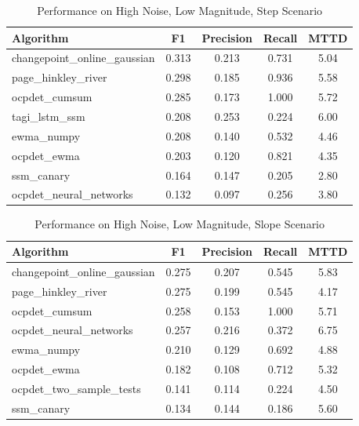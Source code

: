 \documentclass[journal,article,submit,pdftex,moreauthors]{Definitions/mdpi}
\begin{document}
\clearpage

\begin{table}[ht]
\centering
\caption{Performance on High Noise, Low Magnitude, Step Scenario}
\label{tab:scenario_alto_bajo_escalon}
\small
\begin{tabular}{lcccc}
\toprule
\textbf{Algorithm} & \textbf{F1} & \textbf{Precision} & \textbf{Recall} & \textbf{MTTD} \\
\midrule
changepoint\_online\_gaussian & 0.313 & 0.213 & 0.731 & 5.04 \\
page\_hinkley\_river & 0.298 & 0.185 & 0.936 & 5.58 \\
ocpdet\_cumsum & 0.285 & 0.173 & 1.000 & 5.72 \\
tagi\_lstm\_ssm & 0.208 & 0.253 & 0.224 & 6.00 \\
ewma\_numpy & 0.208 & 0.140 & 0.532 & 4.46 \\
ocpdet\_ewma & 0.203 & 0.120 & 0.821 & 4.35 \\
ssm\_canary & 0.164 & 0.147 & 0.205 & 2.80 \\
ocpdet\_neural\_networks & 0.132 & 0.097 & 0.256 & 3.80 \\
\bottomrule
\end{tabular}
\end{table}

\clearpage

\begin{table}[ht]
\centering
\caption{Performance on High Noise, Low Magnitude, Slope Scenario}
\label{tab:scenario_alto_bajo_pendiente}
\small
\begin{tabular}{lcccc}
\toprule
\textbf{Algorithm} & \textbf{F1} & \textbf{Precision} & \textbf{Recall} & \textbf{MTTD} \\
\midrule
changepoint\_online\_gaussian & 0.275 & 0.207 & 0.545 & 5.83 \\
page\_hinkley\_river & 0.275 & 0.199 & 0.545 & 4.17 \\
ocpdet\_cumsum & 0.258 & 0.153 & 1.000 & 5.71 \\
ocpdet\_neural\_networks & 0.257 & 0.216 & 0.372 & 6.75 \\
ewma\_numpy & 0.210 & 0.129 & 0.692 & 4.88 \\
ocpdet\_ewma & 0.182 & 0.108 & 0.712 & 5.32 \\
ocpdet\_two\_sample\_tests & 0.141 & 0.114 & 0.224 & 4.50 \\
ssm\_canary & 0.134 & 0.144 & 0.186 & 5.60 \\
\bottomrule
\end{tabular}
\end{table}
\end{document}
